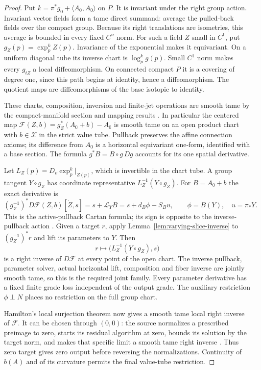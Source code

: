 \documentclass[11pt]{article}
\numberwithin{equation}{section}
\theoremstyle{definition}
\theoremstyle{remark}
\begin{document}
\begin{proof}
Put $k=\pi^*g_0+\langle A_0,A_0\rangle$ on $P$.
It is invariant under the right group action.
Invariant vector fields form a tame direct summand:
average the pulled-back fields over the compact group.
Because its right translations are isometries, this
average is bounded in every fixed $C^n$ norm.
For such a field $Z$ small in $C^1$, put
$g_Z(p)=\exp_p^k Z(p)$. Invariance of the exponential
makes it equivariant. On a uniform diagonal tube its
inverse chart is $\log_p^k g(p)$. Small $C^1$ norm makes
every $g_{tZ}$ a local diffeomorphism. On connected
compact $P$ it is a covering of degree one, since
this path begins at identity, hence a diffeomorphism.
The quotient maps are diffeomorphisms of the base
isotopic to identity.

These charts, composition, inversion and finite-jet
operations are smooth tame by the compact-manifold
section and mapping results
\cite[II.1.3 and II.2.2--II.2.3]{Hamilton1982NashMoser}.
In particular the centered map
$\mathcal F(Z,b)=g_Z^*(A_0+b)-A_0$
is smooth tame on an open product chart with
$b\in\mathcal X$ in the strict value tube.
Pullback preserves the affine connection axioms;
its difference from $A_0$ is a horizontal equivariant
one-form, identified with a base section.
The formula $g^*B=B\circ g\,Dg$ accounts for its
one spatial derivative.

Let $L_Z(p)=D_v\exp_p^k|_{Z(p)}$, which is invertible
in the chart tube. A group tangent $Y\circ g_Z$
has coordinate representative $L_Z^{-1}(Y\circ g_Z)$.
For $B=A_0+b$ the exact derivative is
\[
 (g_Z^{-1})^*D\mathcal F(Z,b)[\dot Z,s]
      =s+\mathcal L_YB=s+d_B\phi+S_Bu,
 \qquad \phi=B(Y),\quad u=\pi_*Y .
\]
This is the active-pullback Cartan formula; its sign
is opposite to the inverse-pullback action
\cite[Lemma 3.2]{Fine2011}.
Given a target $r$, apply
Lemma~\ref{lem:varying-slice-inverse} to
$(g_Z^{-1})^*r$ and lift its parameters to $Y$.
Then
\[
 r\longmapsto
       \big(L_Z^{-1}(Y\circ g_Z),s\big)
\]
is a right inverse of $D\mathcal F$ at every point of
the open chart. The inverse pullback, parameter solver,
actual horizontal lift, composition and fiber inverse
are jointly smooth tame, so this is the required joint
family. Every parameter derivative has a fixed finite
grade loss independent of the output grade. The
auxiliary restriction $\phi\perp N$ places no
restriction on the full group chart.

Hamilton's local surjection theorem
\cite[III.1.1.3, p.~172]{Hamilton1982NashMoser}
now gives a smooth tame local right inverse of
$\mathcal F$. It can be chosen through $(0,0)$:
the source normalizes a prescribed preimage to zero,
starts its residual algorithm at zero, bounds its
solution by the target norm, and makes that specific
limit a smooth tame right inverse
\cite[III.1.2, III.1.5.1, III.1.6.9--III.1.6.10,
III.1.7.1]{Hamilton1982NashMoser}.
Thus zero target gives zero output before reversing
the normalizations. Continuity of $b(A)$ and of its
curvature permits the final value-tube restriction.
\end{proof}
\end{document}
